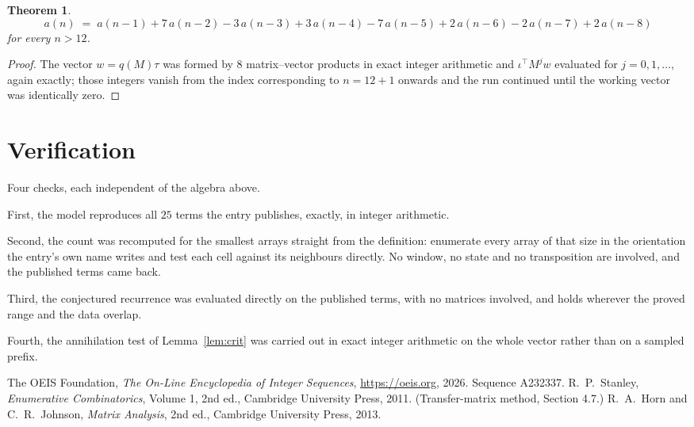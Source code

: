 \documentclass[11pt,a4paper]{article}
\theoremstyle{plain}
\newtheorem{theorem}{Theorem}
\theoremstyle{definition}
\begin{document}
\begin{theorem}
\[
a(n)\;=\;a(n-1) + 7\,a(n-2) - 3\,a(n-3) + 3\,a(n-4) - 7\,a(n-5) + 2\,a(n-6) - 2\,a(n-7) + 2\,a(n-8)
\]
for every $n>12$.
\end{theorem}

\begin{proof}
The vector $w=q(M)\tau$ was formed by $8$ matrix--vector products in exact integer
arithmetic and $\iota^{\!\top}M^{j}w$ evaluated for $j=0,1,\dots$, again exactly; those
integers vanish from the index corresponding to $n=12+1$ onwards and the run continued
until the working vector was identically zero.
\end{proof}

\section{Verification}

Four checks, each independent of the algebra above.

First, the model reproduces all $25$ terms the entry publishes, exactly, in integer
arithmetic.

Second, the count was recomputed for the smallest arrays straight from the definition:
enumerate every array of that size in the orientation the entry's own name writes and test each
cell against its neighbours directly. No window, no state and no transposition are involved,
and the published terms came back.

Third, the conjectured recurrence was evaluated directly on the published terms, with no
matrices involved, and holds wherever the proved range and the data overlap.

Fourth, the annihilation test of Lemma~\ref{lem:crit} was carried out in exact integer
arithmetic on the whole vector rather than on a sampled prefix.

\begin{thebibliography}{9}
 The OEIS Foundation, \emph{The On-Line Encyclopedia of Integer
Sequences}, \url{https://oeis.org}, 2026. Sequence A232337.
 R.~P.~Stanley, \emph{Enumerative Combinatorics}, Volume 1, 2nd ed.,
Cambridge University Press, 2011. (Transfer-matrix method, Section 4.7.)
 R.~A.~Horn and C.~R.~Johnson, \emph{Matrix Analysis}, 2nd ed., Cambridge
University Press, 2013.
\end{thebibliography}
\end{document}
